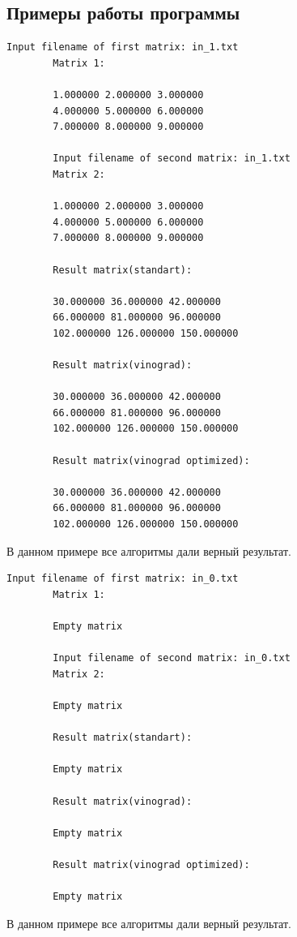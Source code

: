 \documentclass[a4paper, 14pt]{article}
\begin{document}
        \subsection{Примеры работы программы}
		\begin{lstlisting}[label=some-code,caption=Пример работы 1]        
		Input filename of first matrix: in_1.txt
		Matrix 1:

		1.000000 2.000000 3.000000 
		4.000000 5.000000 6.000000 
		7.000000 8.000000 9.000000 

		Input filename of second matrix: in_1.txt
		Matrix 2:

		1.000000 2.000000 3.000000 
		4.000000 5.000000 6.000000 
		7.000000 8.000000 9.000000 

		Result matrix(standart):
	
		30.000000 36.000000 42.000000 
		66.000000 81.000000 96.000000 
		102.000000 126.000000 150.000000 

		Result matrix(vinograd):

		30.000000 36.000000 42.000000 
		66.000000 81.000000 96.000000 
		102.000000 126.000000 150.000000 

		Result matrix(vinograd optimized):

		30.000000 36.000000 42.000000 
		66.000000 81.000000 96.000000 
		102.000000 126.000000 150.000000 
		\end{lstlisting}
		В данном примере все алгоритмы дали верный результат.
		\begin{lstlisting}[label=some-code,caption=Пример работы 2]		
		Input filename of first matrix: in_0.txt
		Matrix 1:

		Empty matrix

		Input filename of second matrix: in_0.txt
		Matrix 2:

		Empty matrix

		Result matrix(standart):
	
		Empty matrix

		Result matrix(vinograd):

		Empty matrix

		Result matrix(vinograd optimized):

		Empty matrix
		\end{lstlisting}
		В данном примере все алгоритмы дали верный результат.
\end{document}
